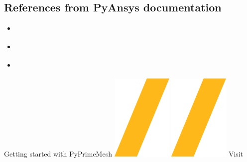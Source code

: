 \documentclass[9pt,landscape]{article}
\begin{document}
\begin{multicols}{3}

\subsection{References from PyAnsys documentation}
\begin{itemize}
\item \href{https://prime.docs.pyansys.com/version/stable/getting_started/index.html}{\color{blue}{Getting started}}
\item \href{https://prime.docs.pyansys.com/version/stable/user_guide/index.html}{\color{blue}{User guide}}
\item \href{https://prime.docs.pyansys.com/version/stable/examples/index.html}{\color{blue}{Examples}}
\end{itemize}
\end{multicols}

\vspace{-0.15cm}
\noindent\makebox[\linewidth]{\rule{\paperwidth}{4pt}}
\begin{center}
Getting started with PyPrimeMesh \includegraphics[height=\fontcharht\font`\S]{slash.png} \href{https://github.com/ansys/pyprimemesh}{\color{blue}{PyPrimeMesh on GitHub}} \includegraphics[height=\fontcharht\font`\S]{slash.png} Visit 
\end{center}
\end{document}
